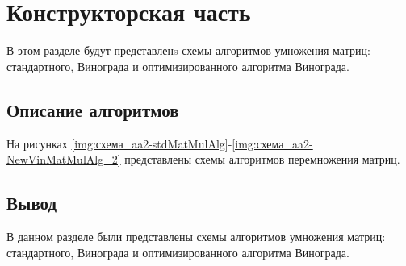 \chapter{Конструкторская часть}
В этом разделе будут представленs схемы алгоритмов умножения матриц: стандартного, Винограда
и оптимизированного алгоритма Винограда.

\section{Описание алгоритмов}
На рисунках \ref{img:схема_aa2-stdMatMulAlg}-\ref{img:схема_aa2-NewVinMatMulAlg_2} представлены схемы алгоритмов перемножения матриц.

\clearpage
{}
\clearpage
{}
\clearpage
{}
\clearpage
{}
\clearpage


\section*{Вывод}

В данном разделе были представлены схемы алгоритмов умножения матриц: стандартного, Винограда
и оптимизированного алгоритма Винограда.

\clearpage
